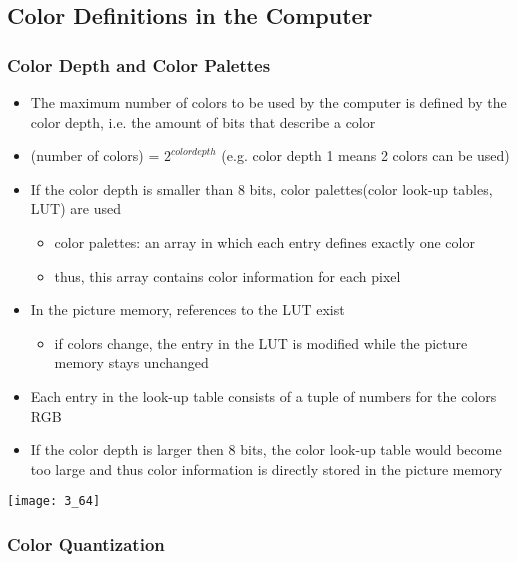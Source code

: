 \documentclass{standalone}
\begin{document}
\subsection{Color Definitions in the Computer}

\subsubsection*{Color Depth and Color Palettes}

\begin{itemize}
	\item The maximum number of colors to be used by the computer is defined by the color depth, i.e. the amount of bits that describe a color
	\item (number of colors) = $2^{color depth}$ (e.g. color depth 1 means 2 colors can be used)
	\item If the color depth is smaller than 8 bits, color palettes(color look-up tables, LUT) are used
	\begin{itemize}
		\item color palettes: an array in which each entry defines exactly one color
		\item thus, this array contains color information for each pixel
	\end{itemize}
	\item In the picture memory, references to the LUT exist
	\begin{itemize}
		\item if colors change, the entry in the LUT is modified while the picture memory stays unchanged
	\end{itemize}
	\item Each entry in the look-up table consists of a tuple of numbers for the colors RGB
	\item If the color depth is larger then 8 bits, the color look-up table would become too large and thus color information is directly stored in the picture memory
\end{itemize}

\texttt{[image: 3\_64]}

\subsubsection*{Color Quantization}
\end{document}
